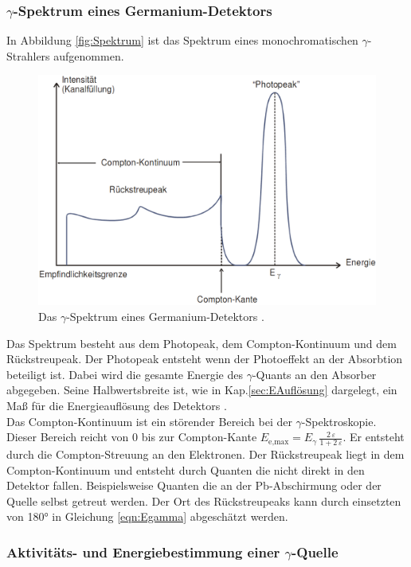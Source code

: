 \subsubsection{\texorpdfstring{$\gamma$}{}-Spektrum eines Germanium-Detektors}
In Abbildung \eqref{fig:Spektrum} ist das Spektrum eines monochromatischen $\gamma$-Strahlers aufgenommen.

\begin{figure} %
	\centering
	\includegraphics[width=0.8\linewidth]{Bilder/Spektrum.png}
	\caption{Das $\gamma$-Spektrum eines Germanium-Detektors \cite{V18}.}
	\label{fig:Spektrum}
\end{figure}

Das Spektrum besteht aus dem Photopeak, dem Compton-Kontinuum und dem Rückstreupeak. Der Photopeak entsteht wenn der Photoeffekt an der Absorbtion beteiligt ist. Dabei wird die gesamte Energie des $\gamma$-Quants an den Absorber abgegeben. Seine Halbwertsbreite ist, wie in Kap.\ref{sec:EAuflösung} dargelegt, ein Maß für die Energieauflösung des Detektors \cite[22]{V18}. \\
Das Compton-Kontinuum ist ein störender Bereich bei der $\gamma$-Spektroskopie. Dieser Bereich reicht von 0 bis zur Compton-Kante $E_\text{e,max} = E_\gamma \, \frac{2\,\varepsilon} {1 + 2\,\varepsilon}$. Er entsteht durch die Compton-Streuung an den Elektronen. Der Rückstreupeak liegt in dem Compton-Kontinuum und entsteht durch Quanten die nicht direkt in den Detektor fallen. Beispielsweise Quanten die an der Pb-Abschirmung oder der Quelle selbst getreut werden. Der Ort des Rückstreupeaks kann durch einsetzten von 180° in Gleichung \eqref{eqn:Egamma} abgeschätzt werden.



\subsubsection{Aktivitäts- und Energiebestimmung einer \texorpdfstring{$\gamma$}{}-Quelle}












